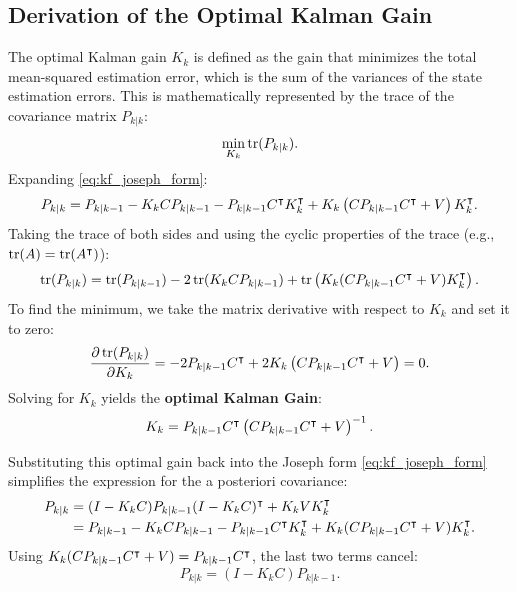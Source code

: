 \subsection{Derivation of the Optimal Kalman Gain}
The optimal Kalman gain $K_k$ is defined as the gain that minimizes the total mean-squared estimation error, which is the sum of the variances of the state estimation errors. This is mathematically represented by the trace of the covariance matrix $P_{k|k}$:
\begin{equation}
\min_{K_k} \operatorname{tr}(P_{k|k}) .
\end{equation}
Expanding \eqref{eq:kf_joseph_form}:
\begin{equation}
P_{k|k} = P_{k|k-1} - K_k C P_{k|k-1} - P_{k|k-1} C^\intercal K_k^\intercal + K_k \left( C P_{k|k-1} C^\intercal + V \right) K_k^\intercal .
\end{equation}
Taking the trace of both sides and using the cyclic properties of the trace (e.g., $\operatorname{tr}(A) = \operatorname{tr}(A^\intercal)$):
\begin{equation}
\operatorname{tr}(P_{k|k}) = \operatorname{tr}(P_{k|k-1}) - 2 \operatorname{tr}(K_k C P_{k|k-1}) + \operatorname{tr}\left( K_k (C P_{k|k-1} C^\intercal + V) K_k^\intercal \right) .
\end{equation}
To find the minimum, we take the matrix derivative with respect to $K_k$ and set it to zero:
\begin{equation}
\frac{\partial \operatorname{tr}(P_{k|k})}{\partial K_k} = -2 P_{k|k-1} C^\intercal + 2 K_k \left( C P_{k|k-1} C^\intercal + V \right) = 0 .
\end{equation}
Solving for $K_k$ yields the \textbf{optimal Kalman Gain}:
\begin{equation}
    K_k = P_{k|k-1} C^\intercal \left( C P_{k|k-1} C^\intercal + V \right)^{-1} . \label{eq:kf_optimal_gain}
\end{equation}

Substituting this optimal gain back into the Joseph form \eqref{eq:kf_joseph_form} simplifies the expression for the a posteriori covariance:
\begin{align}
    P_{k|k} &= (I - K_k C) P_{k|k-1} (I - K_k C)^\intercal + K_k V K_k^\intercal \nonumber \\
&= P_{k|k-1} - K_k C P_{k|k-1} - P_{k|k-1} C^\intercal K_k^\intercal + K_k (C P_{k|k-1} C^\intercal + V) K_k^\intercal .
\end{align}
Using $K_k (C P_{k|k-1} C^\intercal + V) = P_{k|k-1} C^\intercal$, the last two terms cancel:
\begin{equation}
    P_{k|k} = (I - K_k C) P_{k|k-1} . \label{eq:kf_corr_cov}
\end{equation}

